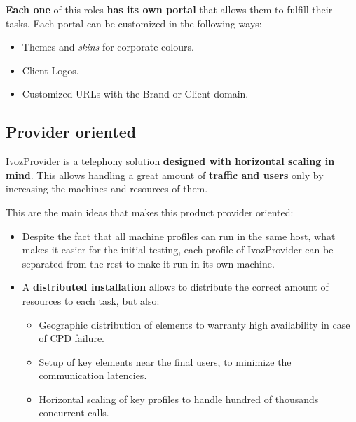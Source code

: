 \documentclass[letterpaper,10pt,english]{sphinxmanual}
\begin{document}
\textbf{Each one} of this roles \textbf{has its own portal} that allows them to
fulfill their tasks. Each portal can be customized in the following
ways:
\begin{itemize}
\item {} 
Themes and \emph{skins} for corporate colours.

\item {} 
Client Logos.

\item {} 
Customized URLs with the Brand or Client domain.

\end{itemize}


\subsection{Provider oriented}
\label{basic_concepts/intro/what_is_ivozprovider:operator-oriented}\label{basic_concepts/intro/what_is_ivozprovider:provider-oriented}
IvozProvider is a telephony solution \textbf{designed with horizontal scaling
in mind}. This allows handling a great amount of \textbf{traffic and users}
only by increasing the machines and resources of them.

This are the main ideas that makes this product provider oriented:
\begin{itemize}
\item {} 
Despite the fact that all machine profiles can run in the same host,
what makes it easier for the initial testing, each profile of IvozProvider
can be separated from the rest to make it run in its own machine.

\item {} 
A \textbf{distributed installation} allows to distribute the correct amount of
resources to each task, but also:
\begin{itemize}
\item {} 
Geographic distribution of elements to warranty high availability in
case of CPD failure.

\item {} 
Setup of key elements near the final users, to minimize the communication
latencies.

\item {} 
Horizontal scaling of key profiles to handle hundred of thousands
concurrent calls.

\end{itemize}

\end{itemize}
\end{document}
